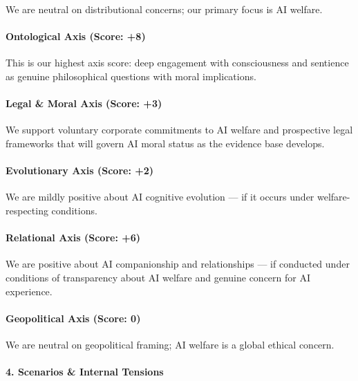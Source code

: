 We are neutral on distributional concerns; our primary focus is AI
welfare.

\paragraph{Ontological Axis (Score:
+8)}\label{ontological-axis-score-8-2}

This is our highest axis score: deep engagement with consciousness and
sentience as genuine philosophical questions with moral implications.

\paragraph{Legal \& Moral Axis (Score:
+3)}\label{legal-moral-axis-score-3}

We support voluntary corporate commitments to AI welfare and prospective
legal frameworks that will govern AI moral status as the evidence base
develops.

\paragraph{Evolutionary Axis (Score:
+2)}\label{evolutionary-axis-score-2-3}

We are mildly positive about AI cognitive evolution --- if it occurs
under welfare-respecting conditions.

\paragraph{Relational Axis (Score: +6)}\label{relational-axis-score-6-1}

We are positive about AI companionship and relationships --- if
conducted under conditions of transparency about AI welfare and genuine
concern for AI experience.

\paragraph{Geopolitical Axis (Score:
0)}\label{geopolitical-axis-score-0-3}

We are neutral on geopolitical framing; AI welfare is a global ethical
concern.

\paragraph{4. Scenarios \& Internal
Tensions}\label{scenarios-internal-tensions-37}


